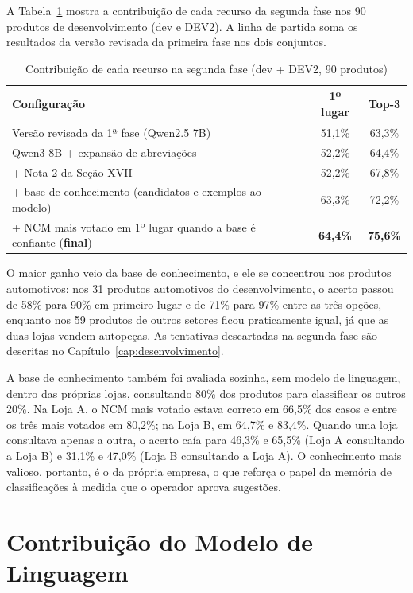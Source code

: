 A Tabela~\ref{tab:versoes_fase2} mostra a contribuição de cada recurso da segunda fase nos 90 produtos de desenvolvimento (dev e DEV2). A linha de partida soma os resultados da versão revisada da primeira fase nos dois conjuntos.

\begin{table}[H]
\centering
\caption{Contribuição de cada recurso na segunda fase (dev + DEV2, 90 produtos)}
\label{tab:versoes_fase2}
\begin{tabular}{p{9.2cm} c c}
\hline
\textbf{Configuração} & \textbf{1º lugar} & \textbf{Top-3} \\
\hline
Versão revisada da 1ª fase (Qwen2.5 7B) & 51,1\% & 63,3\% \\
Qwen3 8B + expansão de abreviações & 52,2\% & 64,4\% \\
+ Nota 2 da Seção XVII & 52,2\% & 67,8\% \\
+ base de conhecimento (candidatos e exemplos ao modelo) & 63,3\% & 72,2\% \\
+ NCM mais votado em 1º lugar quando a base é confiante (\textbf{final}) & \textbf{64,4\%} & \textbf{75,6\%} \\
\hline
\end{tabular}
\end{table}

O maior ganho veio da base de conhecimento, e ele se concentrou nos produtos automotivos: nos 31 produtos automotivos do desenvolvimento, o acerto passou de 58\% para 90\% em primeiro lugar e de 71\% para 97\% entre as três opções, enquanto nos 59 produtos de outros setores ficou praticamente igual, já que as duas lojas vendem autopeças. As tentativas descartadas na segunda fase são descritas no Capítulo~\ref{cap:desenvolvimento}.

A base de conhecimento também foi avaliada sozinha, sem modelo de linguagem, dentro das próprias lojas, consultando 80\% dos produtos para classificar os outros 20\%. Na Loja A, o NCM mais votado estava correto em 66,5\% dos casos e entre os três mais votados em 80,2\%; na Loja B, em 64,7\% e 83,4\%. Quando uma loja consultava apenas a outra, o acerto caía para 46,3\% e 65,5\% (Loja A consultando a Loja B) e 31,1\% e 47,0\% (Loja B consultando a Loja A). O conhecimento mais valioso, portanto, é o da própria empresa, o que reforça o papel da memória de classificações à medida que o operador aprova sugestões.

\section{Contribuição do Modelo de Linguagem}

